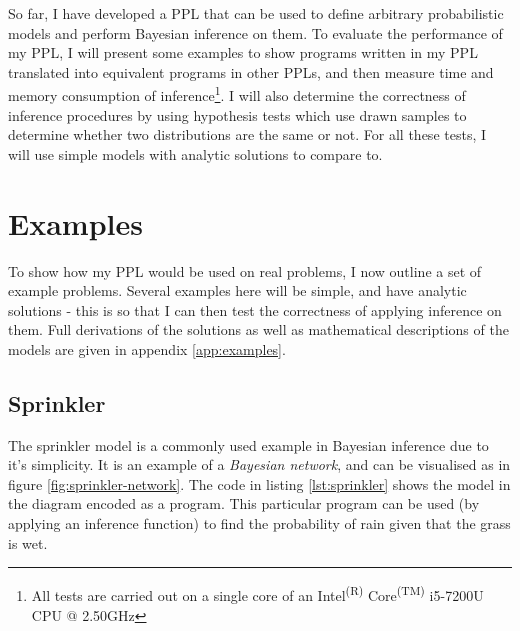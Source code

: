 



So far, I have developed a PPL that can be used to define arbitrary probabilistic models and perform Bayesian inference on them. To evaluate the performance of my PPL, I will present some examples to show programs written in my PPL translated into equivalent programs in other PPLs, and then measure time and memory consumption of inference\footnote{All tests are carried out on a single core of an Intel\textsuperscript{(R)} Core\textsuperscript{(TM)} i5-7200U CPU @ 2.50GHz}. I will also determine the correctness of inference procedures by using hypothesis tests which use drawn samples to determine whether two distributions are the same or not. For all these tests, I will use simple models with analytic solutions to compare to.

\section{Examples}
To show how my PPL would be used on real problems, I now outline a set of example problems. Several examples here will be simple, and have analytic solutions - this is so that I can then test the correctness of applying inference on them. Full derivations of the solutions as well as mathematical descriptions of the models are given in appendix \ref{app:examples}.

\subsection{Sprinkler}
The sprinkler model is a commonly used example in Bayesian inference due to it's simplicity. It is an example of a \textit{Bayesian network}, and can be visualised as in figure \ref{fig:sprinkler-network}. The code in listing \ref{lst:sprinkler} shows the model in the diagram encoded as a program. This particular program can be used (by applying an inference function) to find the probability of rain given that the grass is wet.
	

